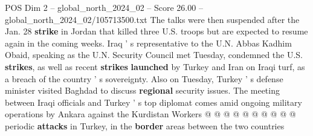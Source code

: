\begin{textsample}{POS Dim 2 – global\_north\_2024\_02 – Score 26.00 – global\_north\_2024\_02/105713500.txt}
The talks were then suspended after the Jan. 28 \textbf{strike} in Jordan that killed three U.S. troops but are expected to resume again in the coming weeks.
Iraq ' s representative to the U.N.
Abbas Kadhim Obaid, speaking as the U.N.
Security Council met Tuesday, condemned the U.S. \textbf{strikes}, as well as recent \textbf{strikes} \textbf{launched} by Turkey and Iran on Iraqi turf, as a breach of the country ' s sovereignty.
Also on Tuesday, Turkey ' s defense minister visited Baghdad to discuss \textbf{regional} security issues.
The meeting between Iraqi officials and Turkey ' s top diplomat comes amid ongoing military operations by Ankara against the Kurdistan Workers @ @ @ @ @ @ @ @ @ @ periodic \textbf{attacks} in Turkey, in the \textbf{border} areas between the two countries

\end{textsample}
